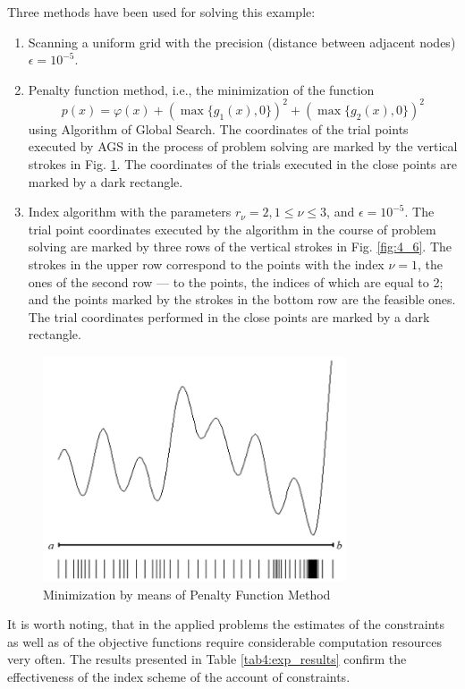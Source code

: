 \documentclass[graybox]{svmult}
\begin{document}
Three methods have been used for solving this example:
\begin{enumerate}

  \item Scanning a uniform grid with the precision (distance between adjacent nodes) $\epsilon=10^{-5}$.
  \item Penalty function method, i.e., the minimization of the function
  \[
  p(x)=\varphi(x)+(\max\{g_1(x),0\})^2+(\max\{g_2(x),0\})^2
  \]
  using Algorithm of Global Search. The coordinates of the trial points executed by AGS in the process of problem solving are marked by the vertical strokes in Fig. \ref{fig:4_5}. The coordinates of the trials executed in the close points are marked by a dark rectangle.
  \item Index algorithm with the parameters $r_\nu=2, 1\le \nu \le 3$, and $\epsilon =10^{- 5}$. The trial point coordinates executed by the algorithm in the course of problem solving are marked by three rows of the vertical strokes in Fig. \ref{fig:4_6}. The strokes in the upper row correspond to the points with the index $\nu=1$, the ones of the second row --- to the points, the indices of which are equal to 2; and the points marked by the strokes in the bottom row are the feasible ones. The trial coordinates performed in the close points are marked by a dark rectangle.
\end{enumerate}

\begin{figure}[h]
  \label{fig:4_5}
  \centering
  \includegraphics[width=0.8\textwidth]{figures/4_5.png}
  \caption{Minimization by means of Penalty Function Method}
\end{figure}

It is worth noting, that in the applied problems the estimates of the constraints as well as of the objective functions require considerable computation resources very often. The results presented in Table \ref{tab4:exp_results} confirm the effectiveness of the index scheme of the account of
constraints.
\end{document}
